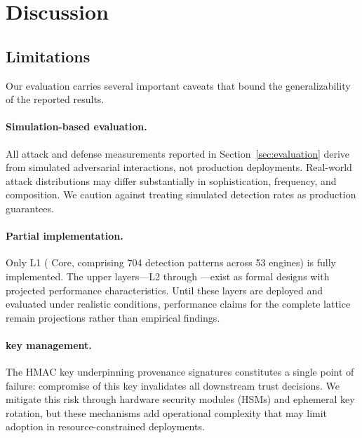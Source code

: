 \section{Discussion}
\label{sec:discussion}

\subsection{Limitations}

Our evaluation carries several important caveats that bound the
generalizability of the reported results.

\paragraph{Simulation-based evaluation.}
All attack and defense measurements reported in Section~\ref{sec:evaluation}
derive from simulated adversarial interactions, not production deployments.
Real-world attack distributions may differ substantially in sophistication,
frequency, and composition.  We caution against treating simulated detection
rates as production guarantees.

\paragraph{Partial implementation.}
Only L1 (\sentinel{} Core, comprising 704 detection patterns across 53
engines) is fully implemented.  The upper layers---L2 through
\mire{}---exist as formal designs with projected performance
characteristics.  Until these layers are deployed and evaluated under
realistic conditions, performance claims for the complete lattice
remain projections rather than empirical findings.

\paragraph{\pasr{} key management.}
The HMAC key underpinning \pasr{} provenance signatures constitutes a
single point of failure: compromise of this key invalidates all
downstream trust decisions.  We mitigate this risk through hardware
security modules (HSMs) and ephemeral key rotation, but these
mechanisms add operational complexity that may limit adoption in
resource-constrained deployments.

